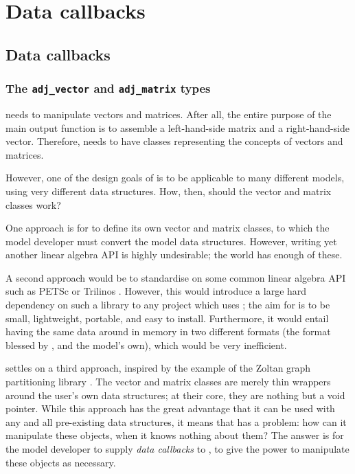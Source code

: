 \chapter{Data callbacks} \label{chap:callbacks}
\minitoc
\vspace{\fill}
\newpage

\section{Data callbacks}
\subsection{The \texttt{adj_vector} and \texttt{adj_matrix} types}
\libadjoint needs to manipulate vectors and matrices. After all, the entire
purpose of the main output function  is to
assemble a left-hand-side matrix and a right-hand-side vector. Therefore,
\libadjoint needs to have classes representing the concepts of vectors and matrices.

However, one of the
design goals of \libadjoint is to be applicable to many different models,
using very different data structures. How, then, should the \libadjoint
vector and matrix classes work?

One approach is for \libadjoint to define its own vector and matrix classes,
to which the model developer must convert the model data structures. However,
writing yet another linear algebra API is highly undesirable; the world
has enough of these.

A second approach would be to standardise on some common linear algebra
API such as PETSc \citep{balay1997,balay2010} or Trilinos \citep{heroux2003}. However,
this would introduce a large hard dependency on such a library to any project which uses \libadjoint;
the aim for \libadjoint is to be small, lightweight, portable, and easy to install. Furthermore,
it would entail having the same data around in memory in two different formats (the format blessed by \libadjoint,
and the model's own), which would be very inefficient.

\libadjoint settles on a third approach, inspired by the example of the Zoltan
graph partitioning library \citep{devine2002}. The \libadjoint vector and matrix
classes are merely thin wrappers around the user's own data structures;
at their core, they are nothing but a void pointer. While this approach has the
great advantage that it can be used with any and all pre-existing data structures,
it means that \libadjoint has a problem: how can it manipulate these objects,
when it knows nothing about them? The answer is for the model developer to supply
\emph{data callbacks} to \libadjoint, to give \libadjoint the power to manipulate
these objects as necessary.

